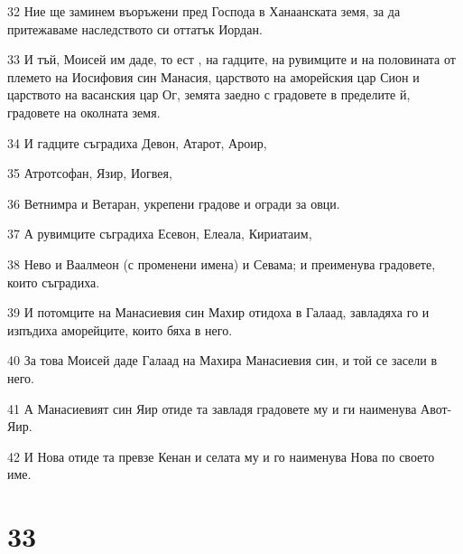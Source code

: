 \par 32 Ние ще заминем въоръжени пред Господа в Ханаанската земя, за да притежаваме наследството си оттатък Иордан.
\par 33 И тъй, Моисей им даде, то ест , на гадците, на рувимците и на половината от племето на Иосифовия син Манасия, царството на аморейския цар Сион и царството на васанския цар Ог, земята заедно с градовете в пределите й, градовете на околната земя.
\par 34 И гадците съградиха Девон, Атарот, Ароир,
\par 35 Атротсофан, Язир, Иогвея,
\par 36 Ветнимра и Ветаран, укрепени градове и огради за овци.
\par 37 А рувимците съградиха Есевон, Елеала, Кириатаим,
\par 38 Нево и Ваалмеон (с променени имена) и Севама; и преименува градовете, които съградиха.
\par 39 И потомците на Манасиевия син Махир отидоха в Галаад, завладяха го и изпъдиха аморейците, които бяха в него.
\par 40 За това Моисей даде Галаад на Махира Манасиевия син, и той се засели в него.
\par 41 А Манасиевият син Яир отиде та завладя градовете му и ги наименува Авот-Яир.
\par 42 И Нова отиде та превзе Кенан и селата му и го наименува Нова по своето име.

\chapter{33}

